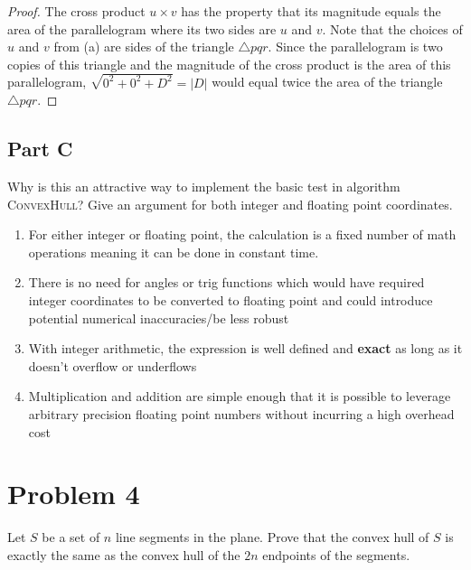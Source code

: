 \documentclass{eeleyes}
\begin{document}
\begin{proof}
    The cross product $u \times v$ has the property that its magnitude equals the area of the parallelogram where its two sides are $u$ and $v$. Note that the choices of $u$ and $v$ from (a) are sides of the triangle $\triangle pqr$. Since the parallelogram is two copies of this triangle and the magnitude of the cross product is the area of this parallelogram, $\sqrt{0^2 + 0^2 + D^2} = |D|$ would equal twice the area of the triangle $\triangle pqr$.
\end{proof}

\begin{problem}
    \subsection*{Part C}
    Why is this an attractive way to implement the basic test in algorithm \textsc{ConvexHull}? Give an argument for both integer and floating point coordinates.
\end{problem}

\begin{enumerate}
    \item For either integer or floating point, the calculation is a fixed number of math operations meaning it can be done in constant time.
    \item There is no need for angles or trig functions which would have required integer coordinates to be converted to floating point and could introduce potential numerical inaccuracies/be less robust
    \item With integer arithmetic, the expression is well defined and \textbf{exact} as long as it doesn't overflow or underflows
    \item Multiplication and addition are simple enough that it is possible to leverage arbitrary precision floating point numbers without incurring a high overhead cost
\end{enumerate}

\section*{Problem 4}

\begin{problem}
    Let $S$ be a set of $n$ line segments in the plane. Prove that the convex hull of $S$ is exactly the same as the convex hull of the $2n$ endpoints of the segments.
\end{problem}
\end{document}
